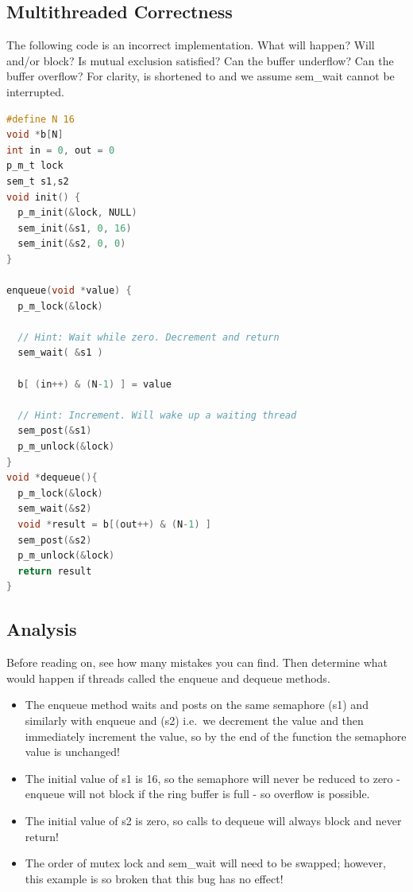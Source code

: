 \subsection{Multithreaded Correctness}

The following code is an incorrect implementation.
What will happen?
Will  and/or  block?
Is mutual exclusion satisfied?
Can the buffer underflow?
Can the buffer overflow?
For clarity,  is shortened to  and we assume sem\_wait cannot be interrupted.

\begin{lstlisting}[language=C]
#define N 16
void *b[N]
int in = 0, out = 0
p_m_t lock
sem_t s1,s2
void init() {
  p_m_init(&lock, NULL)
  sem_init(&s1, 0, 16)
  sem_init(&s2, 0, 0)
}

enqueue(void *value) {
  p_m_lock(&lock)

  // Hint: Wait while zero. Decrement and return
  sem_wait( &s1 )

  b[ (in++) & (N-1) ] = value

  // Hint: Increment. Will wake up a waiting thread
  sem_post(&s1)
  p_m_unlock(&lock)
}
void *dequeue(){
  p_m_lock(&lock)
  sem_wait(&s2)
  void *result = b[(out++) & (N-1) ]
  sem_post(&s2)
  p_m_unlock(&lock)
  return result
}
\end{lstlisting}

\subsection{Analysis}

Before reading on, see how many mistakes you can find. Then determine what would happen if threads called the enqueue and dequeue methods.

\begin{itemize}
\tightlist
\item
  The enqueue method waits and posts on the same semaphore (s1) and similarly with enqueue and (s2) i.e.~we decrement the value and then immediately increment the value, so by the end of the function the semaphore value is unchanged!
\item
  The initial value of s1 is 16, so the semaphore will never be reduced to zero - enqueue will not block if the ring buffer is full - so overflow is possible.
\item
  The initial value of s2 is zero, so calls to dequeue will always block and never return!
\item
  The order of mutex lock and sem\_wait will need to be swapped; however, this example is so broken that this bug has no effect!
\end{itemize}

